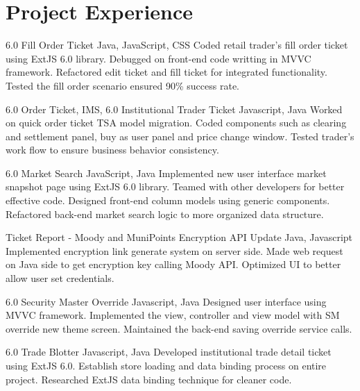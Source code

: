 \documentclass[11pt,a4paper,sans]{moderncv}   %
\begin{document}
\section{Project Experience}
\renewcommand{\baselinestretch}{1.25}

{6.0 Fill Order Ticket}
{Java, JavaScript, CSS}
{}{}
{
	{Coded retail trader's fill order ticket using ExtJS 6.0 library.}
	\newline
	{Debugged on front-end code writting in MVVC framework.}
	\newline
	{Refactored edit ticket and fill ticket for integrated functionality.}
	\newline
	{Tested the fill order scenario ensured 90\% success rate.}
}

{6.0 Order Ticket, IMS, 6.0 Institutional Trader Ticket}
{Javascript, Java}
{}{}
{
	{Worked on quick order ticket TSA model migration.}
	\newline
	{Coded components such as clearing and settlement panel, buy as user panel and price change window.}
	\newline
	{Tested trader's work flow to ensure business behavior consistency.}
}

{6.0 Market Search}
{JavaScript, Java}
{}{}
{
	{Implemented new user interface market snapshot page using ExtJS 6.0 library.}
	\newline
	{Teamed with other developers for better effective code.}
	\newline
	{Designed front-end column models using generic components.}
	\newline
	{Refactored back-end market search logic to more organized data structure.}
}

{Ticket Report - Moody and MuniPoints Encryption API Update}
{Java, Javascript}
{}{}
{
	{Implemented encryption link generate system on server side.}
	\newline
	{Made web request on Java side to get encryption key calling Moody API.}
	\newline
	{Optimized UI to better allow user set credentials.}
}

{6.0 Security Master Override}
{Javascript, Java}
{}{}
{
	{Designed user interface using MVVC framework.}
	\newline
	{Implemented the view, controller and view model with SM override new theme screen.}
	\newline
	{Maintained the back-end saving override service calls.}
}

{6.0 Trade Blotter}
{Javascript, Java}
{}{}
{
	{Developed institutional trade detail ticket using ExtJS 6.0.}
	\newline
	{Establish store loading and data binding process on entire project.}
	\newline
	{Researched ExtJS data binding technique for cleaner code.}
}


\closesection{}                   %
\renewcommand{\listitemsymbol}{-} %
\end{document}
